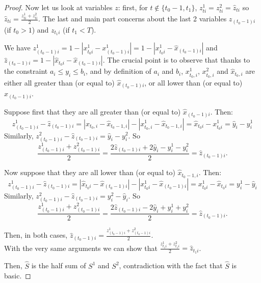 \documentclass[a4paper]{book}
\newtheorem{proof}{\noindent{\bf Proof.} }
\begin{document}
\begin{proof}
Now let us look at  variables $z$: first, for $t\not\in \{t_0-1,t_1\}$, $z^1_{ti}=z^2_{ti}=\hat{z}_{ti}$ so $\hat{z}_{ti}=\frac{z^1_{ti}+z^2_{ti}}{2}$. The last and main part concerns about the last 2 variables $z_{(t_0-1)i}$ (if $t_0>1$) and $z_{t_1i}$ (if $t_1<T$).   	

We have $z^1_{(t_0-1)i}=1-|x^1_{t_0i}-x^1_{(t_0-1)i}|=1-|x^1_{t_0i}-\hat{x}_{(t_0-1)i}|$ and $\hat{z}_{(t_0-1)i}=1-|\hat{x}_{t_0i}-\hat{x}_{(t_0-1)i}|$. The crucial point is to observe that thanks to the constraint $a_i\leq y_i\leq b_i$, and by definition of $a_i$ and $b_i$,  $x^1_{t_0,i}$, $x^2_{t_0,i}$ and $\hat{x}_{t_0,i}$ are either all greater than (or equal to) $\hat{x}_{(t_0-1)i}$, or all lower than (or equal to)  $\hat{x}_{(t_0-1)i}$. 

Suppose first that they are all greater than (or equal to) $\hat{x}_{(t_0-1)i}$. Then:
$$z^1_{(t_0-1)i}-\hat{z}_{(t_0-1)i}=|\hat{x}_{t_0,i}-\hat{x}_{t_0-1,i}|-|x^1_{t_0,i}-\hat{x}_{t_0-1,i}|=\hat{x}_{t_0i}-x^1_{t_0i}=\hat{y}_i-y^1_i$$
Similarly, $z^2_{(t_0-1)i}-\hat{z}_{(t_0-1)i}=\hat{y}_i-y^2_i$. So
	$$\frac{z^1_{(t_0-1)i}+z^2_{(t_0-1)i}}{2}=\frac{2\hat{z}_{(t_0-1)i}+2\hat{y}_i-y^1_{i}-y^2_{i}}{2}=\hat{z}_{(t_0-1)i}.$$

Now suppose that they are all lower than (or equal to) $\hat{x}_{t_0-1,i}$. Then:
$$z^1_{(t_0-1)i}-\hat{z}_{(t_0-1)i}=|\hat{x}_{t_0i}-\hat{x}_{(t_0-1)i}|-|x^1_{t_0i}-\hat{x}_{(t_0-1)i}|=x^1_{t_0i}-\hat{x}_{t_0i}=y^1_i-\hat{y}_i$$
Similarly, $z^2_{(t_0-1)i}-\hat{z}_{(t_0-1)i}=y^2_i-\hat{y}_i$. So
	$$\frac{z^1_{(t_0-1)i}+z^2_{(t_0-1)i}}{2}=\frac{2\hat{z}_{(t_0-1)i}-2\hat{y}_i+y^1_{i}+y^2_{i}}{2}=\hat{z}_{(t_0-1)i}.$$

Then, in both cases, $\hat{z}_{(t_0-1)i}=\frac{z^1_{(t_0-1)i}+z^2_{(t_0-1)i}}{2}$.\\
	
With the very same arguments we can show that  $\frac{z^1_{t_1i}+z^2_{t_1i}}{2}=\hat{z}_{t_1i}$.
	
Then, $\hat{S}$ is the half sum of $S^1$ and $S^2$, contradiction with the fact that $\hat{S}$ is basic.
\end{proof}
\end{document}
